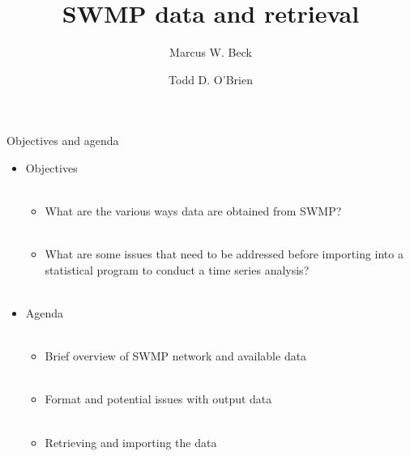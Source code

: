 \documentclass[xcolor=svgnames]{beamer}\usepackage[]{graphicx}\usepackage[]{color}
\begin{document}
\title[Overview of SWMP and retrieval]{SWMP data and retrieval}

\author[M. Beck, T. O'Brien]{Marcus W. Beck \and Todd D. O'Brien}

\date{}







\begin{frame}{Objectives and agenda}
\begin{itemize}
\onslide<+->
\item Objectives \\~\\
\begin{itemize}
\item What are the various ways data are obtained from SWMP? \\~\\
\item What are some issues that need to be addressed before importing into a statistical program to conduct a time series analysis? \\~\\
\end{itemize}
\onslide<+->
\item Agenda \\~\\
\begin{itemize}
\item Brief overview of SWMP network and available data \\~\\
\item Format and potential issues with output data \\~\\
\item Retrieving and importing the data \\~\\
\end{itemize}
\end{itemize}
\end{frame}
\end{document}
